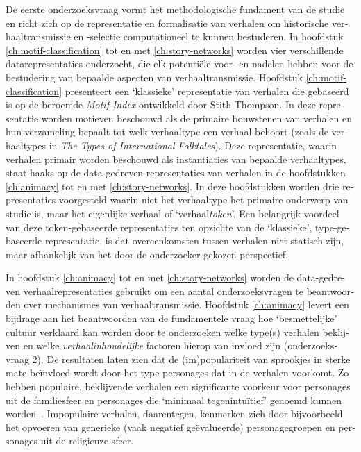 \begin{otherlanguage}{dutch}
De eerste onderzoeksvraag vormt het methodologische fundament van de studie en richt zich op de representatie en formalisatie van verhalen om historische verhaaltransmissie en -selectie computationeel te kunnen bestuderen. In hoofdstuk \ref{ch:motif-classification} tot en met \ref{ch:story-networks} worden vier verschillende datarepresentaties onderzocht, die elk potentiële voor- en nadelen hebben voor de bestudering van bepaalde aspecten van verhaaltransmissie. Hoofdstuk \ref{ch:motif-classification} presenteert een `klassieke' representatie van verhalen die gebaseerd is op de beroemde \emph{Motif-Index} ontwikkeld door Stith Thompson\autocite{thompson:1955}. In deze representatie worden motieven beschouwd als de primaire bouwstenen van verhalen en hun verzameling bepaalt tot welk verhaaltype een verhaal behoort (zoals de verhaaltypes in \emph{The Types of International Folktales}\autocite{uther:2004}). Deze representatie, waarin verhalen primair worden beschouwd als instantiaties van bepaalde verhaaltypes, staat haaks op de data-gedreven representaties van verhalen in de hoofdstukken \ref{ch:animacy} tot en met \ref{ch:story-networks}. In deze hoofdstukken worden drie representaties voorgesteld waarin niet het verhaaltype het primaire onderwerp van studie is, maar het eigenlijke verhaal of `verhaal\emph{token}'. Een belangrijk voordeel van deze token-gebaseerde representaties ten opzichte van de `klassieke', type-gebaseerde representatie, is dat overeenkomsten tussen verhalen niet statisch zijn, maar afhankelijk van het door de onderzoeker gekozen perspectief. 

In hoofdstuk \ref{ch:animacy} tot en met \ref{ch:story-networks} worden de data-gedreven verhaalrepresentaties gebruikt om een aantal onderzoeksvragen te beantwoorden over mechanismes van verhaaltransmissie. Hoofdstuk \ref{ch:animacy} levert een bijdrage aan het beantwoorden van de fundamentele vraag hoe `besmettelijke' cultuur verklaard kan worden\autocite[Vergelijk:][]{sperber:1996} door te onderzoeken welke type(s) verhalen beklijven en welke \emph{verhaalinhoudelijke} factoren hierop van invloed zijn (onderzoeksvraag 2). De resultaten laten zien dat de (im)populariteit van sprookjes in sterke mate beïnvloed wordt door het type personages dat in de verhalen voorkomt. Zo hebben populaire, beklijvende verhalen een significante voorkeur voor personages uit de familiesfeer en personages die `minimaal tegenintuïtief' genoemd kunnen worden~\autocite[Zie bijvoorbeeld][]{Barrett:2009}. Impopulaire verhalen, daarentegen, kenmerken zich door bijvoorbeeld het opvoeren van generieke (vaak negatief geëvalueerde) personagegroepen en personages uit de religieuze sfeer.


\end{otherlanguage}
